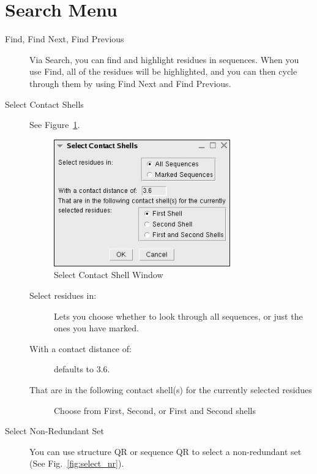 \label{unit8}


\section{Search Menu}

\begin{description}
\item [Find, Find Next, Find Previous] Via \textsf{Search}, you can find
and highlight residues in sequences. When you use \textsf{Find}, all of
the residues will be highlighted, and you can then cycle through them by
using \textsf{Find Next} and \textsf{Find Previous}.

\item[Select Contact Shells]
See Figure~\ref{fig:select_cs}.
 \begin{figure}[here]
 \centerline{\includegraphics [width=3in]{./pictures/select_contactshells.jpg}}
 \caption{Select Contact Shell Window}
\label{fig:select_cs}
\end{figure}

\begin{description}
     \item[Select residues in:] Lets you choose whether to look through
     all sequences, or just the ones you have marked.
     \item[With a contact distance of:] defaults to 3.6.
     \item[That are in the following contact shell(s) for the currently
     selected residues] Choose from \textsf{First}, \textsf{Second}, or
     \textsf{First and Second} shells
\end{description}     

\item[Select Non-Redundant Set]

You can use structure QR or sequence QR to select a non-redundant set
(See Fig.~\ref{fig:select_nr}).


\end{description}
